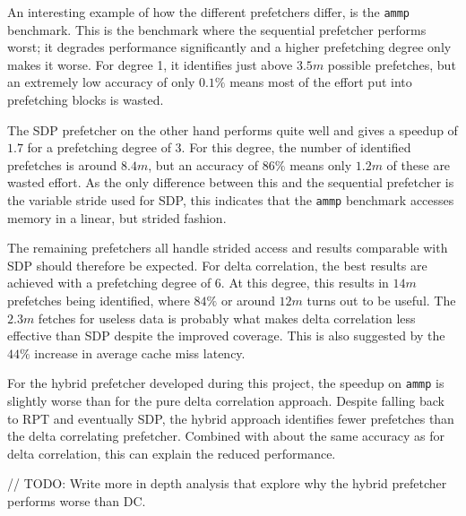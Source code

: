 An interesting example of how the different prefetchers differ, is the \texttt{ammp} benchmark.
This is the benchmark where the sequential prefetcher performs worst;
it degrades performance significantly and a higher prefetching degree only makes
it worse.
For degree 1, it identifies just above $3.5m$ possible prefetches, but an
extremely low accuracy of only $0.1\%$ means most of the effort put into
prefetching blocks is wasted.

The SDP prefetcher on the other hand performs quite well and gives a speedup of
$1.7$ for a prefetching degree of $3$.
For this degree, the number of identified prefetches is around $8.4m$, but an
accuracy of $86\%$ means only $1.2m$ of these are wasted effort.
As the only difference between this and the sequential prefetcher is the
variable stride used for SDP, this indicates that the \texttt{ammp} benchmark
accesses memory in a linear, but strided fashion.

The remaining prefetchers all handle strided access and results comparable with
SDP should therefore be expected.
For delta correlation, the best results are achieved with a prefetching degree of $6$.
At this degree, this results in $14m$ prefetches being identified, where $84\%$
or around $12m$ turns out to be useful.
The $2.3m$ fetches for useless data is probably what makes delta correlation
less effective than SDP despite the improved coverage.
This is also suggested by the $44\%$ increase in average cache miss latency.

For the hybrid prefetcher developed during this project, the speedup on \texttt{ammp} is slightly
worse than for the pure delta correlation approach.
Despite falling back to RPT and eventually SDP, the hybrid approach identifies
fewer prefetches than the delta correlating prefetcher.
Combined with about the same accuracy as for delta correlation, this can explain
the reduced performance.

// TODO: Write more in depth analysis that explore why the hybrid prefetcher performs worse than DC.


